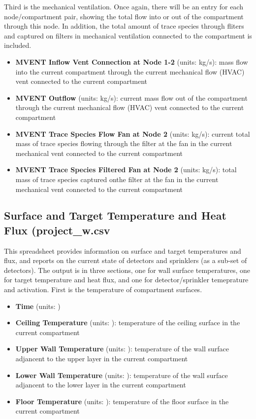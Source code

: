 Third is the mechanical ventilation. Once again, there will be an entry for each node/compartment pair, showing the total flow into or out of the compartment through this node. In addition, the total amount of trace species through fliters and captured on filters in mechanical ventilation connected to the compartment is included.

\begin{itemize}
\item \textbf{MVENT Inflow Vent Connection at Node 1-2} (units: kg/s): mass flow into the current compartment through the current mechanical flow (HVAC) vent connected to the current compartment
\item \textbf{MVENT Outflow} (units: kg/s): current mass flow out of the compartment through the current mechanical flow (HVAC) vent connected to the current compartment
\item \textbf{MVENT Trace Species Flow Fan at Node 2} (units: kg/s): current total mass of trace species flowing through the filter at the fan in the current mechanical vent connected to the current compartment
\item \textbf{MVENT Trace Species Filtered Fan at Node 2} (units: kg/s): total mass of trace species captured onthe filter at the fan in the current mechanical vent connected to the current compartment
\end{itemize}

\subsection{Surface and Target Temperature and Heat Flux (project\_w.csv}

This spreadsheet provides information on surface and target temperatures and flux, and reports on the current state of detectors and sprinklers (as a sub-set of detectors). The output is in three sections, one for wall surface temperatures, one for target temperature and heat flux, and one for detector/sprinkler temeprature and activation. First is the temperature of compartment surfaces.

\begin{itemize}
\item \textbf{Time} (units: \degc)
\item \textbf{Ceiling Temperature} (units: \degc): temperature of the ceiling surface in the current compartment
\item \textbf{Upper Wall Temperature} (units: \degc): temperature of the wall surface adjancent to the upper layer in the current compartment
\item \textbf{Lower Wall Temperature} (units: \degc): temperature of the  wall surface adjancent to the lower layer in the current compartment
\item \textbf{Floor Temperature} (units: \degc): temperature of the floor surface in the current compartment
\end{itemize}

